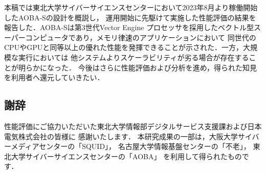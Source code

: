 ﻿\documentclass[submit,techrep,noauthor]{ipsj}
\begin{document}
本稿では東北大学サイバーサイエンスセンターにおいて2023年8月より稼働開始したAOBA-Sの設計を概説し，
運用開始に先駆けて実施した性能評価の結果を報告した．AOBA-Sは第3世代Vector Engine
プロセッサを採用したベクトル型スーパーコンピュータであり，メモリ律速のアプリケーションにおいて
同世代のCPUやGPUと同等以上の優れた性能を発揮できることが示された．一方，大規模な実行においては
他システムよりスケーラビリティが劣る場合が存在することが明らかになった．
今後はさらに性能評価および分析を進め，得られた知見を利用者へ還元していきたい．

\subsection*{謝辞}

性能評価にご協力いただいた東北大学情報部デジタルサービス支援課および日本電気株式会社の皆様に
感謝いたします．
本研究成果の一部は，大阪大学サイバーメディアセンターの「SQUID」，
名古屋大学情報基盤センターの「不老」，
東北大学サイバーサイエンスセンターの「AOBA」
を利用して得られたものです．



\end{document}
